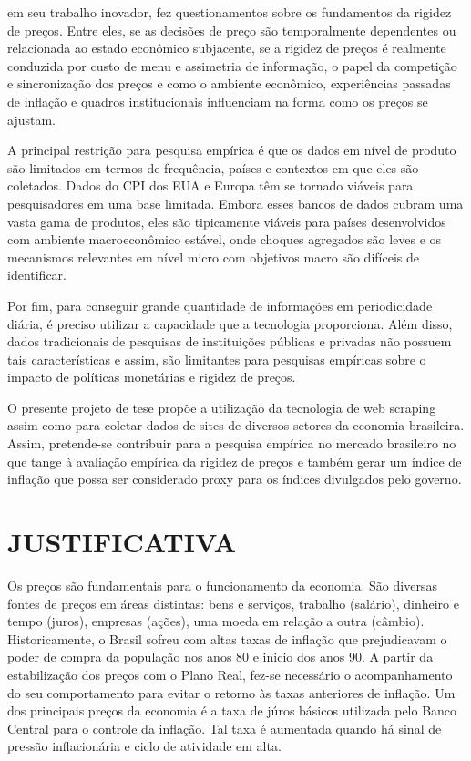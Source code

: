 \documentclass[twoside,a4paper,11pt]{report}
\begin{document}
\citet{cavallo2010scraped} em seu trabalho inovador, fez questionamentos sobre os fundamentos da rigidez de preços. Entre eles, se as decisões de preço são temporalmente dependentes ou relacionada ao estado econômico subjacente, se a rigidez de preços é realmente conduzida por custo de menu e assimetria de informação, o papel da competição e sincronização dos preços e como o ambiente econômico, experiências passadas de inflação e quadros institucionais influenciam na forma como os preços se ajustam.

A principal restrição para pesquisa empírica é que os dados em nível de produto são limitados em termos de frequência, países e contextos em que eles são coletados. Dados do CPI dos EUA e Europa têm se tornado viáveis para pesquisadores em uma base limitada. Embora esses bancos de dados cubram uma vasta gama de produtos, eles são tipicamente viáveis para países desenvolvidos com ambiente macroeconômico estável, onde choques agregados são leves e os mecanismos relevantes em nível micro com objetivos macro são difíceis de identificar. 

Por fim, para conseguir grande quantidade de informações em periodicidade diária, é preciso utilizar a capacidade que a tecnologia proporciona. Além disso, dados tradicionais de pesquisas de instituições públicas e privadas não possuem tais características e assim, são limitantes para pesquisas empíricas sobre o impacto de políticas monetárias e rigidez de preços.

O presente projeto de tese propõe a utilização da tecnologia de web scraping assim como \citet{cavallo2010scraped} para coletar dados de sites de diversos setores da economia brasileira. Assim, pretende-se contribuir para a pesquisa empírica no mercado brasileiro no que tange à avaliação empírica da rigidez de preços e também gerar um índice de inflação que possa ser considerado proxy para os índices divulgados pelo governo. 

\section*{JUSTIFICATIVA}

Os preços são fundamentais para o funcionamento da economia. São diversas fontes de preços em áreas distintas: bens e serviços, trabalho (salário), dinheiro e tempo (juros), empresas (ações), uma moeda em relação a outra (câmbio). Historicamente, o Brasil sofreu com altas taxas de inflação que prejudicavam o poder de compra da população nos anos 80 e inicio dos anos 90. A partir da estabilização dos preços com o Plano Real, fez-se necessário o acompanhamento do seu comportamento para evitar o retorno às taxas anteriores de inflação. Um dos principais preços da economia é a taxa de júros básicos utilizada pelo Banco Central para o controle da inflação. Tal taxa é aumentada quando há sinal de pressão inflacionária e ciclo de atividade em alta.
\end{document}
